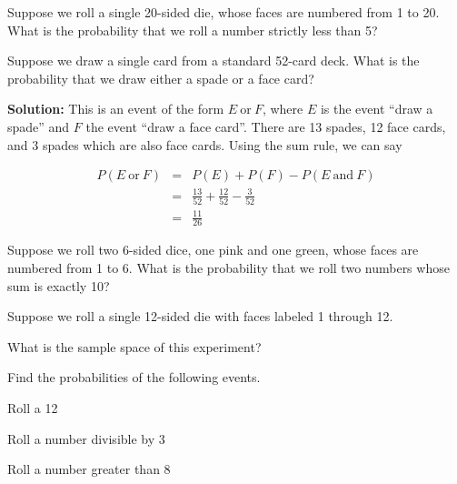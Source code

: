 \documentclass{article}
\begin{document}
\ActivityTitle[class=Statistics, number=2, name={Probability}]

\begin{enumerate}
\item Suppose we roll a single 20-sided die, whose faces are numbered from 1 to 20. What is the probability that we roll a number strictly less than 5?



  
\vspace{5cm}

\item Suppose we draw a single card from a standard 52-card deck. What is the probability that we draw either a spade or a face card?

\textbf{Solution:} This is an event of the form $E \ \mathrm{or}\ F$, where $E$ is the event ``draw a spade'' and $F$ the event ``draw a face card''. There are 13 spades, 12 face cards, and 3 spades which are also face cards. Using the sum rule, we can say

\begin{eqnarray*}
P(E \ \mathrm{or}\ F) & = & P(E) + P(F) - P(E \ \mathrm{and}\ F) \\
 & = & \frac{13}{52} + \frac{12}{52} - \frac{3}{52} \\
 & = & \frac{11}{26}
\end{eqnarray*}


  
\vspace{5cm}

\item Suppose we roll two 6-sided dice, one pink and one green, whose faces are numbered from 1 to 6. What is the probability that we roll two numbers whose sum is exactly 10?

  
\vspace{5cm}

\item Suppose we roll a single 12-sided die with faces labeled 1 through 12.

\begin{enumerate*}
\item What is the sample space of this experiment?
\item Find the probabilities of the following events.
\begin{enumerate*}
\item Roll a 12
\item Roll a number divisible by 3
\item Roll a number greater than 8
\end{enumerate*}
\end{enumerate*}


\end{enumerate}
\end{document}
